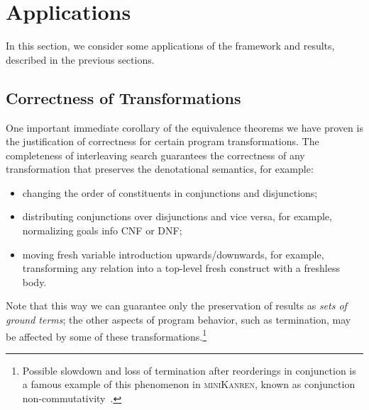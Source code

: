 \section{Applications}
\label{applications}

In this section, we consider some applications of the framework and results, described in the previous sections.

\subsection{Correctness of Transformations}

One important immediate corollary of the equivalence theorems we have proven is the justification of correctness for certain program transformations.
The completeness of interleaving search guarantees the correctness of any transformation that preserves the denotational semantics,
for example:

\begin{itemize}
\item changing the order of constituents in conjunctions and disjunctions;
\item distributing conjunctions over disjunctions and vice versa, for example, normalizing goals info CNF or DNF;
\item moving fresh variable introduction upwards/downwards, for example, transforming any relation into a top-level fresh
  construct with a freshless body.
\end{itemize}

Note that this way we can guarantee only the preservation of results as \emph{sets of ground terms}; the other aspects of program behavior,
such as termination, may be affected by some of these transformations.\footnote{Possible slowdown and loss of termination after reorderings in conjunction is a famous example of this phenomenon in \textsc{miniKanren}, known as conjunction non-commutativity~\cite{WillThesis}.}

